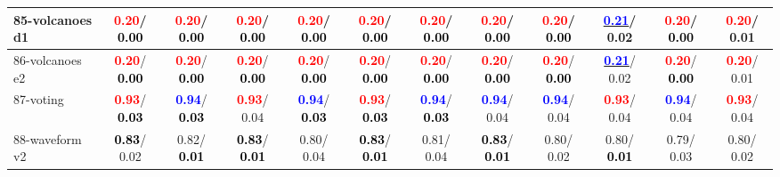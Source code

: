 \begin{table}[h]
\begin{center}
{\begin{tabular}{lc|c|c|c|c|c|c|c|c|c|c}
85-volcanoes d1 & \textcolor{red}{\textbf{  0.20}}/\textcolor{black}{\textbf{  0.00}} & \textcolor{red}{\textbf{  0.20}}/\textcolor{black}{\textbf{  0.00}} & \textcolor{red}{\textbf{  0.20}}/\textcolor{black}{\textbf{  0.00}} & \textcolor{red}{\textbf{  0.20}}/\textcolor{black}{\textbf{  0.00}} & \textcolor{red}{\textbf{  0.20}}/\textcolor{black}{\textbf{  0.00}} & \textcolor{red}{\textbf{  0.20}}/\textcolor{black}{\textbf{  0.00}} & \textcolor{red}{\textbf{  0.20}}/\textcolor{black}{\textbf{  0.00}} & \textcolor{red}{\textbf{  0.20}}/\textcolor{black}{\textbf{  0.00}} & \underline{\textcolor{blue}{\textbf{  0.21}}}/  0.02 & \textcolor{red}{\textbf{  0.20}}/\textcolor{black}{\textbf{  0.00}} & \textcolor{red}{\textbf{  0.20}}/  0.01 \\ \hline
86-volcanoes e2 & \textcolor{red}{\textbf{  0.20}}/\textcolor{black}{\textbf{  0.00}} & \textcolor{red}{\textbf{  0.20}}/\textcolor{black}{\textbf{  0.00}} & \textcolor{red}{\textbf{  0.20}}/\textcolor{black}{\textbf{  0.00}} & \textcolor{red}{\textbf{  0.20}}/\textcolor{black}{\textbf{  0.00}} & \textcolor{red}{\textbf{  0.20}}/\textcolor{black}{\textbf{  0.00}} & \textcolor{red}{\textbf{  0.20}}/\textcolor{black}{\textbf{  0.00}} & \textcolor{red}{\textbf{  0.20}}/\textcolor{black}{\textbf{  0.00}} & \textcolor{red}{\textbf{  0.20}}/\textcolor{black}{\textbf{  0.00}} & \underline{\textcolor{blue}{\textbf{  0.21}}}/  0.02 & \textcolor{red}{\textbf{  0.20}}/\textcolor{black}{\textbf{  0.00}} & \textcolor{red}{\textbf{  0.20}}/  0.01 \\
87-voting & \textcolor{red}{\textbf{  0.93}}/\textcolor{black}{\textbf{  0.03}} & \textcolor{blue}{\textbf{  0.94}}/\textcolor{black}{\textbf{  0.03}} & \textcolor{red}{\textbf{  0.93}}/  0.04 & \textcolor{blue}{\textbf{  0.94}}/\textcolor{black}{\textbf{  0.03}} & \textcolor{red}{\textbf{  0.93}}/\textcolor{black}{\textbf{  0.03}} & \textcolor{blue}{\textbf{  0.94}}/\textcolor{black}{\textbf{  0.03}} & \textcolor{blue}{\textbf{  0.94}}/  0.04 & \textcolor{blue}{\textbf{  0.94}}/  0.04 & \textcolor{red}{\textbf{  0.93}}/  0.04 & \textcolor{blue}{\textbf{  0.94}}/  0.04 & \textcolor{red}{\textbf{  0.93}}/  0.04 \\
88-waveform v2 & \textcolor{black}{\textbf{  0.83}}/  0.02 &   0.82/\textcolor{black}{\textbf{  0.01}} & \textcolor{black}{\textbf{  0.83}}/\textcolor{black}{\textbf{  0.01}} &   0.80/  0.04 & \textcolor{black}{\textbf{  0.83}}/\textcolor{black}{\textbf{  0.01}} &   0.81/  0.04 & \textcolor{black}{\textbf{  0.83}}/\textcolor{black}{\textbf{  0.01}} &   0.80/  0.02 &   0.80/\textcolor{black}{\textbf{  0.01}} &   0.79/  0.03 &   0.80/  0.02 \\

\end{tabular}}
\end{center}
\end{table}
